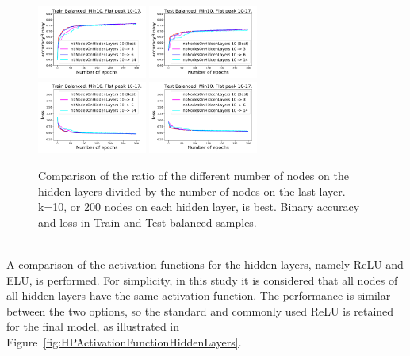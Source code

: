 \begin{figure}[!htb]
\centering
\includegraphics[width=0.32\textwidth]{plots/plot_01_1_overlay_graph_accuracyBinary_Train_NbNodesOnHiddenLayers.pdf}
\includegraphics[width=0.32\textwidth]{plots/plot_01_1_overlay_graph_accuracyBinary_Test_NbNodesOnHiddenLayers.pdf}\\
\includegraphics[width=0.32\textwidth]{plots/plot_01_1_overlay_graph_loss_Train_NbNodesOnHiddenLayers.pdf}
\includegraphics[width=0.32\textwidth]{plots/plot_01_1_overlay_graph_loss_Test_NbNodesOnHiddenLayers.pdf}\\
\caption{Comparison of the ratio of the different number of nodes on the hidden layers divided by the number of nodes on the last layer. k=10, or 200 nodes on each hidden layer, is best. Binary accuracy and loss in Train and Test balanced samples.}
\label{fig:HPNbNodesOnHiddenLayers}
\end{figure}

\ \\A comparison of the activation functions for the hidden layers, namely ReLU and ELU, is performed. For simplicity, in this study it is considered that all nodes of all hidden layers have the same activation function. The performance is similar between the two options, so the standard and commonly used ReLU is retained for the final model, as illustrated in Figure~\ref{fig:HPActivationFunctionHiddenLayers}.

